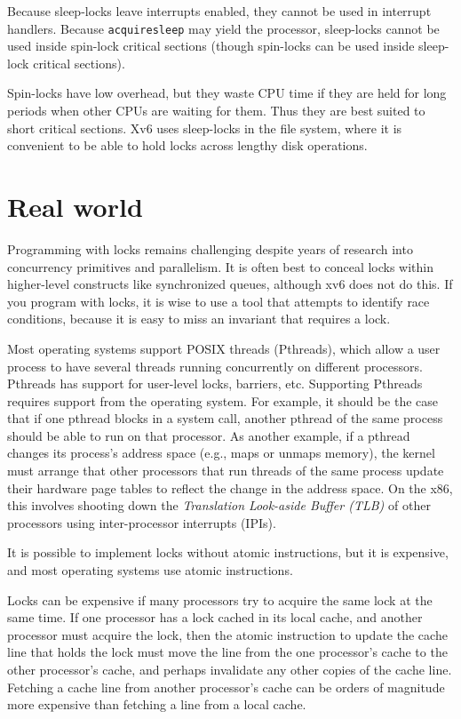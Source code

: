 Because sleep-locks leave interrupts enabled, they cannot be
used in interrupt handlers.
Because
\lstinline{acquiresleep}
may yield the processor,
sleep-locks cannot be used inside spin-lock critical
sections (though spin-locks can be used inside sleep-lock
critical sections).

Spin-locks have low overhead, but they waste CPU time if they
are held for long periods when other CPUs are waiting
for them.
Thus they are best suited to short critical sections.
Xv6 uses sleep-locks in the file system,
where it is convenient to
be able to hold locks across lengthy disk operations.
\section{Real world}
Programming with locks remains challenging despite years of research
into concurrency primitives and parallelism.
It is often best to conceal locks within 
higher-level constructs like synchronized queues, although xv6 does not
do this.  If you program with locks, it is wise to use a tool that attempts to
identify race conditions, because it is easy to miss an invariant that requires
a lock.

Most operating systems support POSIX threads (Pthreads), which allow a user
process to have several threads running concurrently on different processors.
Pthreads has support for user-level locks, barriers, etc.  Supporting Pthreads requires
support from the operating system. For example, it should be the case that if
one pthread blocks in a system call, another pthread of the same process should
be able to run on that processor.  As another example, if a pthread changes its
process's address space (e.g., maps or unmaps memory), the kernel must arrange that
other processors that run threads of the same process update their hardware page
tables to reflect the change in the address space.  On the x86, this involves
shooting down the
\textit{Translation Look-aside Buffer (TLB)}
of other processors using inter-processor interrupts (IPIs).

It is possible to implement locks without atomic instructions, but it is
expensive, and most operating systems use atomic instructions.

Locks can be expensive if many processors try to acquire the same lock
at the same time.  If one processor has a lock
cached in its local cache, and another processor must acquire the lock, then the
atomic instruction to update the cache line that holds the lock must move the line
from the one processor's cache to the other processor's cache, and perhaps
invalidate any other copies of the cache line.  Fetching a cache line from
another processor's cache can be orders of magnitude more expensive than
fetching a line from a local cache.

